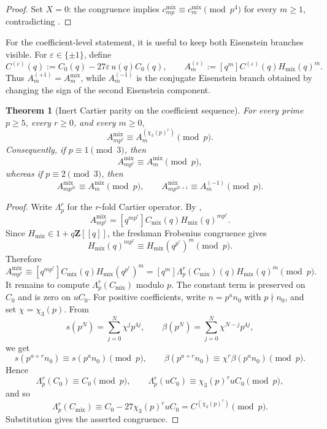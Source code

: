 \documentclass[11pt]{amsart}
\newtheorem{theorem}{Theorem}[section]
\theoremstyle{definition}
\theoremstyle{remark}
\newcommand{\Z}{\mathbf{Z}}
\begin{document}
\begin{proof}
Set $X=0$: the congruence implies $c_{mp}^{\mathrm{mix}}\equiv c_m^{\mathrm{mix}}\pmod{p^4}$ for every $m\ge 1$, contradicting .
\end{proof}


For the coefficient-level statement, it is useful to keep both Eisenstein branches visible. For \(\varepsilon\in\{\pm1\}\), define
\[
C^{(\varepsilon)}(q):=C_0(q)-27\varepsilon\,u(q)C_0(q),
\qquad
A_m^{(\varepsilon)}:=[q^m]C^{(\varepsilon)}(q)H_{\mathrm{mix}}(q)^m.
\]
Thus \(A_m^{(+1)}=A_m^{\mathrm{mix}}\), while \(A_m^{(-1)}\) is the conjugate Eisenstein branch obtained by changing the sign of the second Eisenstein component.

\begin{theorem}[Inert Cartier parity on the coefficient sequence]\label{thm:inert-cartier-parity}
For every prime \(p\ge5\), every \(r\ge0\), and every \(m\ge0\),
\[
A_{mp^r}^{\mathrm{mix}}\equiv A_m^{(\chi_3(p)^r)}\pmod p.
\]
Consequently, if \(p\equiv1\pmod3\), then
\[
A_{mp^r}^{\mathrm{mix}}\equiv A_m^{\mathrm{mix}}\pmod p,
\]
whereas if \(p\equiv2\pmod3\), then
\[
A_{mp^{2r}}^{\mathrm{mix}}\equiv A_m^{\mathrm{mix}}\pmod p,
\qquad
A_{mp^{2r+1}}^{\mathrm{mix}}\equiv A_m^{(-1)}\pmod p.
\]
\end{theorem}

\begin{proof}
Write \(\Lambda_p^r\) for the \(r\)-fold Cartier operator. By ,
\[
A_{mp^r}^{\mathrm{mix}}=[q^{mp^r}]C_{\mathrm{mix}}(q)H_{\mathrm{mix}}(q)^{mp^r}.
\]
Since \(H_{\mathrm{mix}}\in1+q\Z[[q]]\), the freshman Frobenius congruence gives
\[
H_{\mathrm{mix}}(q)^{mp^r}\equiv H_{\mathrm{mix}}(q^{p^r})^m\pmod p.
\]
Therefore
\[
A_{mp^r}^{\mathrm{mix}}
\equiv [q^{mp^r}]C_{\mathrm{mix}}(q)H_{\mathrm{mix}}(q^{p^r})^m
=[q^m]\Lambda_p^r(C_{\mathrm{mix}})(q)H_{\mathrm{mix}}(q)^m
\pmod p.
\]
It remains to compute \(\Lambda_p^r(C_{\mathrm{mix}})\) modulo \(p\). The constant term is preserved on \(C_0\) and is zero on \(uC_0\). For positive coefficients, write \(n=p^an_0\) with \(p\nmid n_0\), and set \(\chi=\chi_3(p)\). From
\[
s(p^N)=\sum_{j=0}^N\chi^jp^{4j},\qquad
\beta(p^N)=\sum_{j=0}^N\chi^{N-j}p^{4j},
\]
we get
\[
s(p^{a+r}n_0)\equiv s(p^an_0)\pmod p,
\qquad
\beta(p^{a+r}n_0)\equiv \chi^r\beta(p^an_0)\pmod p.
\]
Hence
\[
\Lambda_p^r(C_0)\equiv C_0\pmod p,
\qquad
\Lambda_p^r(uC_0)\equiv \chi_3(p)^r uC_0\pmod p,
\]
and so
\[
\Lambda_p^r(C_{\mathrm{mix}})
\equiv C_0-27\chi_3(p)^r uC_0
=C^{(\chi_3(p)^r)}
\pmod p.
\]
Substitution gives the asserted congruence.
\end{proof}
\end{document}
